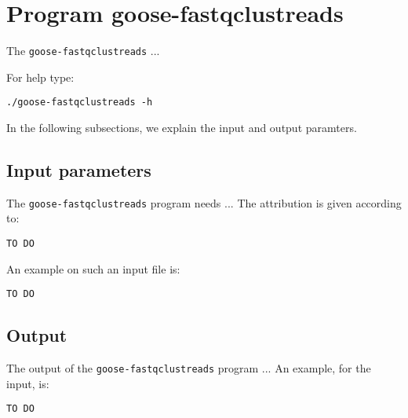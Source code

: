 \section{Program goose-fastqclustreads}
The \texttt{goose-fastqclustreads} ...

For help type:
\begin{lstlisting}
./goose-fastqclustreads -h
\end{lstlisting}
In the following subsections, we explain the input and output paramters.

\subsection*{Input parameters}

The \texttt{goose-fastqclustreads} program needs ...
The attribution is given according to:
\begin{lstlisting}
TO DO
\end{lstlisting}

An example on such an input file is:
\begin{lstlisting}
TO DO
\end{lstlisting}

\subsection*{Output}
The output of the \texttt{goose-fastqclustreads} program ...
An example, for the input, is:
\begin{lstlisting}
TO DO
\end{lstlisting}
